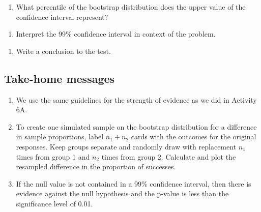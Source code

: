 \documentclass[
]{report}
\providecommand{\tightlist}{%
  \setlength{\itemsep}{0pt}\setlength{\parskip}{0pt}}
\begin{document}
\vspace{0.4in}

\begin{enumerate}
\def\labelenumi{\arabic{enumi}.}
\setcounter{enumi}{12}
\tightlist
\item
  What percentile of the bootstrap distribution does the upper value of the confidence interval represent?
\end{enumerate}

\vspace{0.3in}

\begin{enumerate}
\def\labelenumi{\arabic{enumi}.}
\setcounter{enumi}{13}
\tightlist
\item
  Interpret the 99\% confidence interval in context of the problem.
\end{enumerate}

\vspace{1in}

\begin{enumerate}
\def\labelenumi{\arabic{enumi}.}
\setcounter{enumi}{14}
\tightlist
\item
  Write a conclusion to the test.
\end{enumerate}

\vspace{0.8in}

\newpage

\hypertarget{take-home-messages-13}{%
\subsection{Take-home messages}\label{take-home-messages-13}}

\begin{enumerate}
\def\labelenumi{\arabic{enumi}.}
\item
  We use the same guidelines for the strength of evidence as we did in Activity 6A.
\item
  To create one simulated sample on the bootstrap distribution for a difference in sample proportions, label \(n_1 + n_2\) cards with the outcomes for the original responses. Keep groups separate and randomly draw with replacement \(n_1\) times from group 1 and \(n_2\) times from group 2. Calculate and plot the resampled difference in the proportion of successes.
\item
  If the null value is not contained in a 99\% confidence interval, then there is evidence against the null hypothesis and the p-value is less than the significance level of 0.01.
\end{enumerate}
\end{document}
